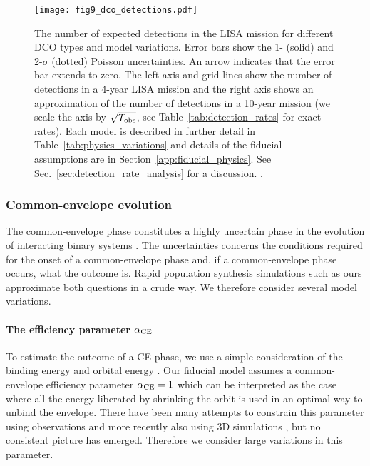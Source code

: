 \begin{figure*}[p]
    \centering
    \texttt{[image: fig9\_dco\_detections.pdf]}
    \caption{The number of expected detections in the LISA mission for different DCO types and model variations. Error bars show the 1- (solid) and 2-$\sigma$ (dotted) Poisson uncertainties. An arrow indicates that the error bar extends to zero. The left axis and grid lines show the number of detections in a 4-year LISA mission and the right axis shows an approximation of the number of detections in a 10-year mission (we scale the axis by $\sqrt{T_{\rm obs}}$, see Table~\ref{tab:detection_rates} for exact rates). Each model is described in further detail in Table~\ref{tab:physics_variations} and details of the fiducial assumptions are in Section~\ref{app:fiducial_physics}. See Sec.~\ref{sec:detection_rate_analysis} for a discussion. \href{https://github.com/TomWagg/detecting-DCOs-in-LISA/blob/main/paper/figures/fig9_dco_detections.pdf}{\faFileImage} \href{https://github.com/TomWagg/detecting-DCOs-in-LISA/blob/main/paper/figure_notebooks/detections.ipynb}{\faBook}.}
    \label{fig:detection_rates}
\end{figure*}

\subsubsection{Common-envelope evolution}\label{sec:detection_rate_CE_trends}

The common-envelope phase constitutes a highly uncertain phase in the evolution of interacting binary systems \citep[e.g.\ ][]{Ivanova+2013}. The uncertainties concerns the conditions required for the onset of a common-envelope phase and, if a common-envelope phase occurs, what the outcome is. Rapid population synthesis simulations such as ours approximate both questions in a crude way. We therefore consider several model variations. 

\paragraph{The efficiency parameter $\alpha_{\rm CE}$} To estimate the outcome of a CE phase, we use a simple consideration of the binding energy and orbital energy \citep{Webbink+1984, deKool+1990}. Our fiducial model assumes a common-envelope efficiency parameter $\alpha_{\rm CE} = 1$ which can be interpreted as the case where all the energy liberated by shrinking the orbit is used in an optimal way to unbind the envelope. There have been many attempts to constrain this parameter using observations and more recently also using 3D simulations \citep[e.g.\ ][]{DeMarco+2011, Fragos+2019, Law-Smith+2020}, but no consistent picture has emerged. Therefore we consider large variations in this parameter. 

